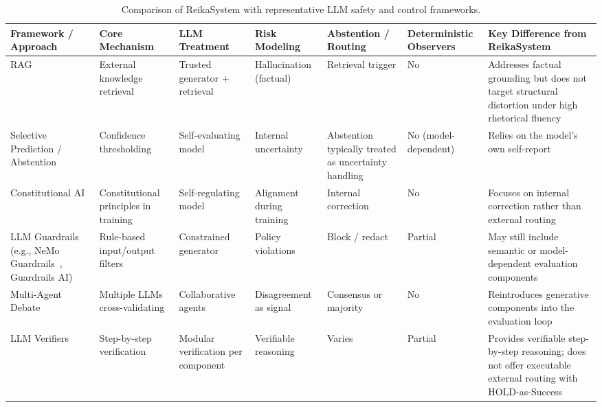 \documentclass[11pt,a4paper]{article}
\begin{document}
\begin{table}[t]
\centering
\caption{Comparison of ReikaSystem with representative LLM safety and control frameworks.}
\label{tab:related_frameworks}
\begin{tabular}{p{3.2cm} p{2.6cm} p{2.2cm} p{2.4cm} p{2.6cm} p{1.9cm} p{4.2cm}}
\toprule
\textbf{Framework / Approach} &
\textbf{Core Mechanism} &
\textbf{LLM Treatment} &
\textbf{Risk Modeling} &
\textbf{Abstention / Routing} &
\textbf{Deterministic Observers} &
\textbf{Key Difference from ReikaSystem} \\
\midrule
RAG~\cite{lewis2020rag}
&
External knowledge retrieval
&
Trusted generator + retrieval
&
Hallucination (factual)
&
Retrieval trigger
&
No
&
Addresses factual grounding but does not target structural distortion under high rhetorical fluency
\\

Selective Prediction / Abstention~\cite{geifman2017selective}
&
Confidence thresholding
&
Self-evaluating model
&
Internal uncertainty
&
Abstention typically treated as uncertainty handling
&
No (model-dependent)
&
Relies on the model's own self-report
\\

Constitutional AI~\cite{bai2022constitutional}
&
Constitutional principles in training
&
Self-regulating model
&
Alignment during training
&
Internal correction
&
No
&
Focuses on internal correction rather than external routing
\\

LLM Guardrails (e.g., NeMo Guardrails~\cite{rebedea2023nemo}, Guardrails AI)
&
Rule-based input/output filters
&
Constrained generator
&
Policy violations
&
Block / redact
&
Partial
&
May still include semantic or model-dependent evaluation components
\\

Multi-Agent Debate~\cite{du2023improving}
&
Multiple LLMs cross-validating
&
Collaborative agents
&
Disagreement as signal
&
Consensus or majority
&
No
&
Reintroduces generative components into the evaluation loop
\\

LLM Verifiers~\cite{cobbe2021verifiers}
&
Step-by-step verification
&
Modular verification per component
&
Verifiable reasoning
&
Varies
&
Partial
&
Provides verifiable step-by-step reasoning; does not offer executable external routing with HOLD-as-Success
\\
\bottomrule
\end{tabular}
\end{table}
\end{document}
